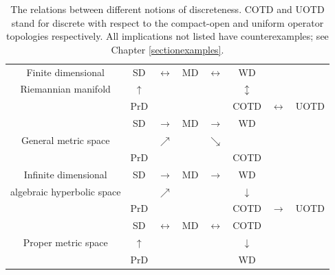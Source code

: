 \begin{table}[h!]
\begin{tabular}{ | c | c c c c c c c | }
 \hline
 Finite dimensional			& SD & $\leftrightarrow$ & MD & $\leftrightarrow$ & WD && \\
 Riemannian manifold 	& $\uparrow$ & & & & $\updownarrow$ && \\
	 			& PrD & & & & COTD & $\leftrightarrow$ & UOTD\\
 \hline
	 		& SD & $\rightarrow$ & MD & $\rightarrow$ & WD && \\
 General metric space		& & $\nearrow$ & & $\searrow$ & && \\
				& PrD & & & & COTD && \\
 \hline
 Infinite dimensional				& SD & $\rightarrow$ & MD & $\rightarrow$ & WD && \\
 algebraic hyperbolic space 	& & $\nearrow$ & & & $\downarrow$ && \\
			& PrD & & & & COTD & $\rightarrow$ & UOTD \\
 \hline
	 		& SD & $\leftrightarrow$ & MD & $\leftrightarrow$ & COTD && \\
 Proper metric  space 		& $\uparrow$ & & & & $\downarrow$ &&\\
			& PrD & & & & WD && \\
 \hline
\end{tabular}
\vskip0.12cm
\caption{The relations between different notions of discreteness. COTD and UOTD stand for discrete with respect to the compact-open and uniform operator topologies respectively. All implications not listed have counterexamples; see Chapter \ref{sectionexamples}.}
\label{figurediscreteness}
\end{table}


